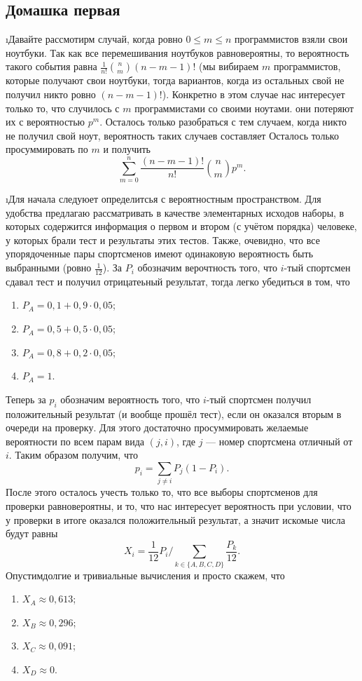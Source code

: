 \subsection{Домашка первая}

\i Давайте рассмотирм случай, когда ровно $0 \leq m \leq n$ программистов взяли свои ноутбуки. Так как все перемешивания ноутбуков равновероятны, то вероятность 
такого события равна $\frac{1}{n!}\binom{n}{m} (n-m-1)!$ (мы вибираем $m$ программистов, которые получают свои ноутбуки, тогда вариантов, когда из остальных 
свой не получил никто ровно $(n-m-1)!$). Конкретно в этом случае нас интересует только то, что случилось с $m$ программистами со своими ноутами. они 
потеряют их с вероятностью $p^m$. Осталось только разобраться с тем случаем, когда никто не получил свой ноут, вероятность таких случаев составляет
Осталось только просуммировать по $m$ и получить 
\[\sum_{m=0}^n \frac{(n-m-1)!}{n!}\binom{n}{m}p^m.\]

\i Для начала следуюет определитсья с вероятностным пространством. Для удобства предлагаю рассматривать в качестве элементарных исходов наборы, в которых
содержится информация о первом и втором (с учётом порядка) человеке, у которых брали тест и результаты этих тестов. Также, очевидно, что все упорядоченные
пары спортсменов имеют одинаковую вероятность быть выбранными (ровно $\frac{1}{12}$). За $P_i$ обозначим верочтность того, что $i$-тый спортсмен сдавал тест
и получил отрицатеьный результат, тогда легко убедиться в том, что 

\begin{enumerate}
    \item $P_A = 0{,}1 +  0{,}9 \cdot 0{,}05$;
    \item $P_A = 0{,}5 +  0{,}5 \cdot 0{,}05$;
    \item $P_A = 0{,}8 +  0{,}2 \cdot 0{,}05$;
    \item $P_A = 1$.
\end{enumerate}
Теперь за $p_i$ обозначим вероятность того, что $i$-тый спортсмен получил положительный результат (и вообще прошёл тест), если он оказался вторым в очереди на 
проверку. Для этого достаточно просуммировать желаемые вероятности по всем парам вида $(j, i)$, где $j$ --- номер спортсмена отличный от $i$. Таким образом 
получим, что 
\[p_i = \sum_{j \ne i} P_j (1-P_i).\]
После этого осталось учесть только то, что все выборы спортсменов для проверки равновероятны, и то, что нас интересует вероятность при условии, что у проверки 
в итоге оказался положительный результат, а значит искомые числа будут равны 
\[X_i = \frac{1}{12}P_i / \sum_{k \in \{A, B, C, D\}} \frac{P_k}{12} .\]
Опустимдолгие и тривиальные вычисления и просто скажем, что 
\begin{enumerate}
    \item $X_A \approx 0{,}613$;
    \item $X_B \approx 0{,}296$;
    \item $X_C \approx 0{,}091$;
    \item $X_D \approx 0$.
\end{enumerate}
